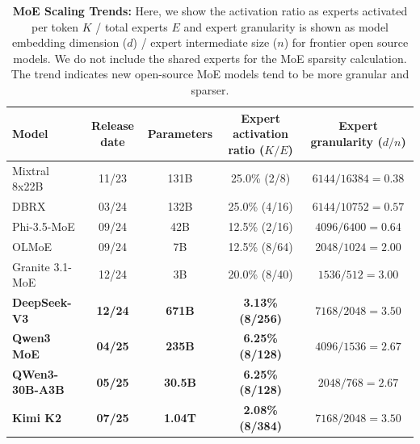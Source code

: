 \begin{table}[!ht]
\centering
\caption{\small \textbf{MoE Scaling Trends:} Here, we show the activation ratio as experts activated per token $K$ / total experts $E$ and expert granularity is shown as model embedding dimension ($d$) / expert intermediate size ($n$) for frontier open source models. We do not include the shared experts for the MoE sparsity calculation. The trend indicates new open-source MoE models tend to be more granular and sparser. }

\label{tab:moe-scaling}

\setlength{\tabcolsep}{4pt}
\renewcommand{\arraystretch}{1.1}
\fontsize{8pt}{10pt}\selectfont
\begin{tabular}{lcccc}
\toprule
\textbf{Model} & \textbf{Release date} & \textbf{Parameters} & \textbf{Expert activation ratio ($K/E$)} & \textbf{Expert granularity ($d/n$)} \\
\midrule
Mixtral 8x22B \citep{mistral2024mixtral}&11/23 & 131B & 25.0\% (2/8) & $6144 / 16384 = 0.38$ \\

DBRX \citep{dbrx2024}&03/24 & 132B & 25.0\% (4/16) & $6144 / 10752 = 0.57$ \\


Phi-3.5-MoE \citep{azure2024phi35moe}& 09/24 & 42B & 12.5\% (2/16) & $4096 / 6400 = 0.64$ \\

OLMoE \citep{muennighoff2024olmoe} & 09/24 & 7B & 12.5\% (8/64) & $2048 / 1024 = 2.00$ \\

Granite 3.1-MoE \citep{granite3.1_language_models}& 12/24 & 3B & 20.0\% (8/40) & $1536 / 512 = 3.00$ \\
\textbf{DeepSeek-V3} \citep{deepseekai2025deepseekv3technicalreport}& \textbf{12/24} & \textbf{671B} & \textbf{3.13\% (8/256)} & \textbf{$7168 / 2048 = 3.50$} \\

\textbf{Qwen3 MoE} \citep{qwen3_2024} & \textbf{04/25} & \textbf{235B} & \textbf{6.25\% (8/128)} & \textbf{$4096 / 1536 = 2.67$} \\

\textbf{QWen3-30B-A3B} \citep{qwen3technicalreport} & \textbf{05/25} & \textbf{30.5B} & \textbf{6.25\% (8/128)} & \textbf{$2048 / 768 = 2.67$} \\

\textbf{Kimi K2} \citep{kimiteam2025kimik2openagentic} & \textbf{07/25} & \textbf{1.04T} & \textbf{2.08\% (8/384)} & \textbf{$7168 / 2048 = 3.50$} \\


\end{tabular}
\end{table}
